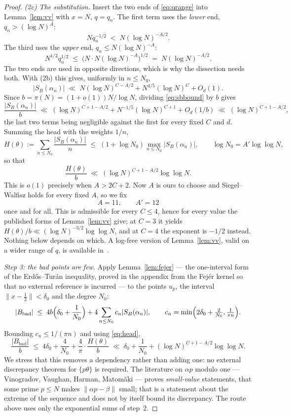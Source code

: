 \documentclass[11pt,a4paper]{article}
\theoremstyle{plain}
\theoremstyle{definition}
\theoremstyle{remark}
\begin{document}
\begin{proof}
\emph{(2c) The substitution.} Insert the two ends of \eqref{eq:qrange} into
Lemma~\ref{lem:vv} with $x=N$, $q=q_n$. The first term uses the \emph{lower}
end, $q_n>(\log N)^{A}$:
\[
  Nq_n^{-1/2}\;<\;N(\log N)^{-A/2}.
\]
The third uses the \emph{upper} end, $q_n\le N(\log N)^{-A}$:
\[
  N^{1/2}q_n^{1/2}\;\le\;\bigl(N\cdot N(\log N)^{-A}\bigr)^{1/2}
  \;=\;N(\log N)^{-A/2}.
\]
The two ends are used in opposite directions, which is why the dissection needs
both. With (2b) this gives, uniformly in $n\le N_0$,
\begin{equation}\label{eq:sbbound}
  |S_B(\alpha_n)|\;\ll\;N(\log N)^{C-A/2}+N^{4/5}(\log N)^{C}+O_d(1).
\end{equation}
Since $b=\pi(N)=(1+o(1))N/\log N$, dividing \eqref{eq:sbbound} by $b$ gives
\[
  \frac{|S_B(\alpha_n)|}{b}\;\ll\;(\log N)^{C+1-A/2}+N^{-1/5}(\log N)^{C+1}
  +O_d(1/b)\;\ll\;(\log N)^{C+1-A/2},
\]
the last two terms being negligible against the first for every fixed $C$ and
$d$. Summing the head with the weights $1/n$,
\[
  H(\theta):=\sum_{n\le N_0}\frac{|S_B(\alpha_n)|}{n}
  \;\le\;(1+\log N_0)\max_{n\le N_0}|S_B(\alpha_n)|,
  \qquad \log N_0=A'\log\log N,
\]
so that
\begin{equation}\label{eq:head}
  \frac{H(\theta)}{b}\;\ll\;(\log N)^{C+1-A/2}\log\log N .
\end{equation}
This is $o(1)$ precisely when $A>2C+2$. Now $A$ is ours to choose and
Siegel--Walfisz holds for every fixed $A$, so we fix
\[
  A=11,\qquad A'=12
\]
once and for all. This is admissible for every $C\le4$, hence for every value
the published forms of Lemma~\ref{lem:vv} give; at $C=3$ it yields
$H(\theta)/b\ll(\log N)^{-3/2}\log\log N$, and at $C=4$ the exponent is
$-1/2$ instead. Nothing below depends on which. A log-free version of
Lemma~\ref{lem:vv}, valid on a wider range of $q$, is available in~\cite{Sr25}.

\emph{Step 3: the bad points are few.} Apply Lemma~\ref{lem:fejer} --- the
one-interval form of the Erd\H{o}s--Tur\'an inequality, proved in the appendix
from the Fej\'er kernel so that no external reference is incurred --- to the
points $u_p$, the interval $\|x-\tfrac12\|<\delta_0$ and the degree $N_0$:
\[
  |B_{\mathrm{bad}}|\;\le\;4b\Bigl(\delta_0+\frac{1}{N_0}\Bigr)
    +4\sum_{n\le N_0}c_n|S_B(\alpha_n)|,
  \qquad c_n=\min\Bigl(2\delta_0+\tfrac{2}{N_0},\tfrac1{\pi n}\Bigr).
\]
Bounding $c_n\le1/(\pi n)$ and using \eqref{eq:head},
\begin{equation}\label{eq:bad}
  \frac{|B_{\mathrm{bad}}|}{b}\;\le\;4\delta_0+\frac4{N_0}
    +\frac4\pi\cdot\frac{H(\theta)}{b}
  \;\ll\;\delta_0+\frac1{N_0}+(\log N)^{C+1-A/2}\log\log N .
\end{equation}
We stress that this removes a dependency rather than adding one: no external
discrepancy theorem for $\{p\theta\}$ is required. The literature on $\alpha p$
modulo one --- Vinogradov, Vaughan, Harman, Matom\"aki --- proves \emph{small-value}
statements, that some prime $p\le N$ makes $\|\alpha p-\beta\|$ small; that is a
statement about the extreme of the sequence and does not by itself bound its
discrepancy. The route above uses only the exponential sums of step~2.


\end{proof}
\end{document}
